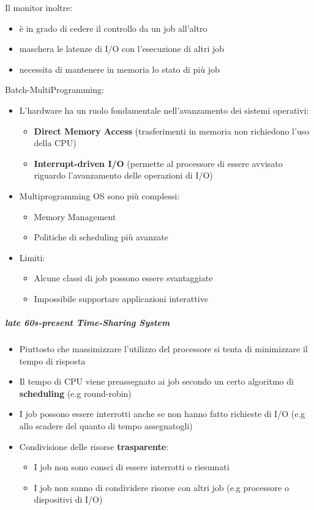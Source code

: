 Il monitor inoltre: \begin{itemize}
\item è in grado di cedere il controllo da un job all'altro
\item maschera le latenze di I/O con l'esecuzione di altri job
\item necessita di mantenere in memoria lo stato di più job
\end{itemize}
Batch-MultiProgramming: 
\begin{itemize}
\item L'hardware ha un ruolo fondamentale nell'avanzamento dei sistemi operativi:
 \begin{itemize}
 \item \textbf{Direct Memory Access} (trasferimenti in memoria non richiedono l'uso della CPU)
 \item \textbf{Interrupt-driven I/O} (permette al processore di essere avvisato riguardo l'avanzamento delle operazioni di I/O)
 \end{itemize}
\item  Multiprogramming OS sono più complessi:
 \begin{itemize}
 \item Memory Management
 \item Politiche di scheduling più avanzate
 \end{itemize}
\item Limiti:
 \begin{itemize}
 \item Alcune classi di job possono essere svantaggiate
 \item Impossibile supportare applicazioni interattive
 \end{itemize}
\end{itemize}
\subparagraph{late 60s-present Time-Sharing System}
\begin{itemize}
\item Piuttosto che massimizzare l'utilizzo del processore si tenta di minimizzare il tempo di risposta
\item Il tempo di CPU viene preassegnato ai job secondo un certo algoritmo di \textbf{scheduling} (e.g round-robin)
\item I job possono essere interrotti anche se non hanno fatto richieste di I/O (e.g allo scadere del quanto di tempo assegnatogli)
\item Condivisione delle risorse \textbf{trasparente}:
 \begin{itemize}
 \item I job non sono consci di essere interrotti o riesumati
 \item I job non sanno di condividere risorse con altri job (e.g processore o dispositivi di I/O)
 \end{itemize}
\end{itemize}

